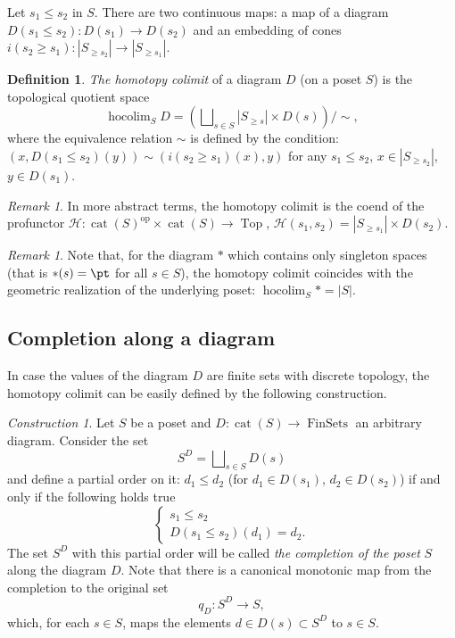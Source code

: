 \documentclass[english,12pt,oneside]{amsproc}
\DeclareMathOperator{\cat}{cat}
\DeclareMathOperator{\FinSets}{FinSets}
\DeclareMathOperator{\Top}{Top}
\DeclareMathOperator{\hocolim}{hocolim}
\DeclareMathOperator{\op}{op}
\newcommand{\simc}{\!\!\sim}
\newcommand{\ca}[1]{\mathcal{#1}}
\newcounter{stmcounter}[section]
\numberwithin{equation}{section}
\theoremstyle{plain}
\theoremstyle{definition}
\newtheorem{defin}[stmcounter]{Definition}
\theoremstyle{remark}
\newtheorem{rem}[stmcounter]{Remark}
\newtheorem{con}[stmcounter]{Construction}
\begin{document}
Let $s_1\leqslant s_2$ in $S$. There are two continuous maps: a map of a diagram $D(s_1\leqslant s_2)\colon D(s_1)\to D(s_2)$ and an embedding of cones $i(s_2\geqslant s_1)\colon |S_{\geqslant s_2}|\to |S_{\geqslant s_1}|$.

\begin{defin}
\emph{The homotopy colimit} of a diagram $D$ (on a poset $S$) is the topological quotient space
\[
\hocolim_{S}D=\left(\bigsqcup\nolimits_{s\in S}|S_{\geqslant s}|\times D(s)\right)/\simc,
\]
where the equivalence relation $\sim$ is defined by the condition: $(x,D(s_1\leqslant s_2)(y))\sim (i(s_2\geqslant s_1)(x),y)$ for any $s_1\leqslant s_2$, $x\in |S_{\geqslant s_2}|$, $y\in D(s_1)$.
\end{defin}

\begin{rem}
In more abstract terms, the homotopy colimit is the coend of the profunctor $\ca{H}\colon \cat(S)^{\op}\times\cat(S)\to\Top$, $\ca{H}(s_1,s_2)=|S_{\geqslant s_1}|\times D(s_2)$.
\end{rem}

\begin{rem}
Note that, for the diagram $\ast$ which contains only singleton spaces (that is $\ast(s)=\pt$ for all $s\in S$), the homotopy colimit coincides with the geometric realization of the underlying poset: $\hocolim_S \ast=|S|$.
\end{rem}

\subsection{Completion along a diagram}\label{completion}

In case the values of the diagram $D$ are finite sets with discrete topology, the homotopy colimit can be easily defined by the following construction.

\begin{con}\label{conCompletion}
Let $S$ be a poset and $D\colon \cat(S)\to \FinSets$ an arbitrary diagram. Consider the set
\[
S^D=\bigsqcup\nolimits_{s\in S}D(s)
\]
and define a partial order on it: $d_1\leqslant d_2$ (for $d_1\in D(s_1)$, $d_2\in D(s_2)$) if and only if the following holds true
\[
\begin{cases}
  s_1\leqslant s_2 \\
  D(s_1\leqslant s_2)(d_1)=d_2.
\end{cases}
\]
The set $S^D$ with this partial order will be called \emph{the completion of the poset} $S$ along the diagram $D$. Note that there is a canonical monotonic map from the completion to the original set
\[
q_D\colon S^D\to S,
\]
which, for each $s\in S$, maps the elements $d\in D(s)\subset S^D$ to $s\in S$.
\end{con}
\end{document}
